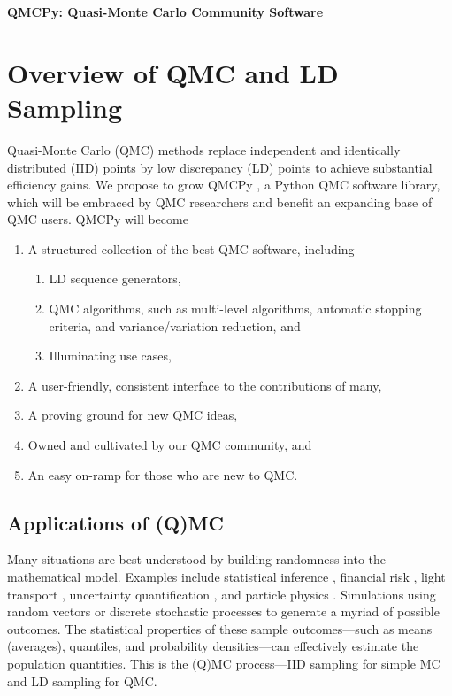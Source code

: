 \documentclass[11pt]{NSFamsart}
\begin{document}

\begin{center}
\Large \textbf{
QMCPy: Quasi-Monte Carlo Community Software\\ 
}
\end{center}
\vspace{-2ex}

\setcounter{tocdepth}{1}
\tableofcontents

\vspace{-6ex}

\section{Overview of QMC and LD Sampling}

Quasi-Monte Carlo (QMC) methods replace independent and identically distributed (IID) points by low discrepancy (LD) points to achieve substantial efficiency gains.  We propose to grow QMCPy \cite{QMCPy2020a}, a Python QMC software library, which will be embraced by QMC researchers and benefit an expanding base of QMC users.  QMCPy will become
\begin{enumerate}
\renewcommand{\labelenumi}{\arabic{enumi}.}
    \item A structured collection of the best QMC software, including
    \begin{enumerate}
    \renewcommand{\labelenumii}{\alph{enumii}.}
        \item LD sequence generators,
        \item QMC algorithms, such as multi-level algorithms, automatic stopping criteria, and variance/variation reduction, and
        \item Illuminating use cases,
    \end{enumerate}
    \item A user-friendly, consistent interface to the contributions of many,
    \item A proving ground for new QMC ideas,
    \item Owned and cultivated by our QMC community, and
    \item An easy on-ramp for those who are new to QMC.
\end{enumerate}

\subsection{Applications of (Q)MC}  Many situations are best understood by building randomness into the mathematical model.  Examples include statistical inference \cite{}, financial risk \cite{Gla03}, light transport \cite{}, uncertainty quantification \cite{}, and particle physics \cite{}.  Simulations using random vectors or discrete stochastic processes to generate a myriad of possible outcomes.  The statistical properties of these sample outcomes---such as means (averages), quantiles, and probability densities---can effectively estimate the population quantities.  This is the (Q)MC process---IID sampling for simple MC and LD sampling for QMC.
\end{document}
